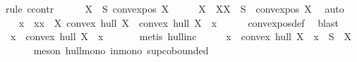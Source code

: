 \begin{isabellebody}
%
\isadelimproof
%
\endisadelimproof
%
\isatagproof
{}\isamarkupfalse%
{\isacharparenleft}{\kern0pt}rule\ ccontr{\isacharparenright}{\kern0pt}\isanewline
\ \ \isamarkupfalse%
\ {\isachardoublequoteopen}{\isasymnot}\ {\isacharparenleft}{\kern0pt}{\isasymforall}\ X\ {\isasymsubseteq}\ S{\isachardot}{\kern0pt}\ convex{\isacharunderscore}{\kern0pt}pos\ X{\isacharparenright}{\kern0pt}{\isachardoublequoteclose}\isanewline
\ \ \isamarkupfalse%
\ \isamarkupfalse%
\ X\ \ X{\isacharcolon}{\kern0pt}{\isachardoublequoteopen}X\ {\isasymsubseteq}\ S{\isachardoublequoteclose}\ {\isachardoublequoteopen}{\isasymnot}\ {\isacharparenleft}{\kern0pt}convex{\isacharunderscore}{\kern0pt}pos\ X{\isacharparenright}{\kern0pt}{\isachardoublequoteclose}\ \isamarkupfalse%
\ auto\isanewline
\ \ \isamarkupfalse%
\ \isamarkupfalse%
\ x\ \ x{\isacharcolon}{\kern0pt}{\isachardoublequoteopen}x\ {\isasymin}\ X{\isachardoublequoteclose}\ {\isachardoublequoteopen}convex\ hull\ X\ {\isacharequal}{\kern0pt}\ convex\ hull\ {\isacharparenleft}{\kern0pt}X\ {\isacharminus}{\kern0pt}\ {\isacharbraceleft}{\kern0pt}x{\isacharbraceright}{\kern0pt}{\isacharparenright}{\kern0pt}{\isachardoublequoteclose}\isanewline
\ \ \ \ \isamarkupfalse%
\ convex{\isacharunderscore}{\kern0pt}pos{\isacharunderscore}{\kern0pt}def\ \isamarkupfalse%
\ blast\isanewline
\ \ \isamarkupfalse%
\ \isamarkupfalse%
\ {\isachardoublequoteopen}x\ {\isasymin}\ convex\ hull\ {\isacharparenleft}{\kern0pt}X\ {\isacharminus}{\kern0pt}\ {\isacharbraceleft}{\kern0pt}x{\isacharbraceright}{\kern0pt}{\isacharparenright}{\kern0pt}{\isachardoublequoteclose}\ \isanewline
\ \ \ \ \isamarkupfalse%
\ {\isacharparenleft}{\kern0pt}metis\ hull{\isacharunderscore}{\kern0pt}inc{\isacharparenright}{\kern0pt}\isanewline
\ \ \isamarkupfalse%
\ \isamarkupfalse%
\ {\isachardoublequoteopen}x\ {\isasymin}\ convex\ hull\ {\isacharparenleft}{\kern0pt}{\isacharparenleft}{\kern0pt}X\ {\isacharminus}{\kern0pt}\ {\isacharbraceleft}{\kern0pt}x{\isacharbraceright}{\kern0pt}{\isacharparenright}{\kern0pt}\ {\isasymunion}\ {\isacharparenleft}{\kern0pt}S\ {\isacharminus}{\kern0pt}\ X{\isacharparenright}{\kern0pt}{\isacharparenright}{\kern0pt}{\isachardoublequoteclose}\ \isanewline
\ \ \ \ \isamarkupfalse%
\ {\isacharparenleft}{\kern0pt}meson\ hull{\isacharunderscore}{\kern0pt}mono\ in{\isacharunderscore}{\kern0pt}mono\ sup{\isachardot}{\kern0pt}cobounded{}{\isacharparenright}{\kern0pt}\isanewline

\end{isabellebody}
